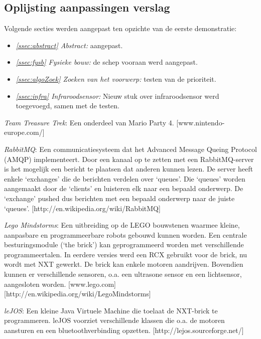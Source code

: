 \documentclass[tt2]{penoverslag}
\begin{document}
\subsection{Oplijsting aanpassingen verslag} %
\label{Assec:aanp1}
Volgende secties werden aangepast ten opzichte van de eerste demonstratie:

\begin{itemize}
\item \textit{\ref{ssec:abstract} Abstract:} aangepast.
\item \textit{\ref{ssec:fysb} Fysieke bouw:} de schep vooraan werd aangepast.
\item \textit{\ref{ssec:algoZoek} Zoeken van het voorwerp:} testen van de prioriteit.
\item \textit{\ref{ssec:infra} Infraroodsensor:} Nieuw stuk over infraroodsensor werd toegevoegd, samen met de testen.

\end{itemize}


\begin{thebibliography}{9}

\textit{Team Treasure Trek}: Een onderdeel van Mario Party 4. \mbox{[www.nintendo-europe.com/]}

\textit{RabbitMQ}: Een communicatiesysteem dat het Advanced Message Queing Protocol (AMQP) implementeert. Door een kanaal op te zetten met een RabbitMQ-server is het mogelijk een bericht te plaatsen dat anderen kunnen lezen. De server heeft enkele `exchanges' die de berichten verdelen over `queues'. Die `queues' worden aangemaakt door de `clients' en luisteren elk naar een bepaald onderwerp. De `exchange' pushed dus berichten met een bepaald onderwerp naar de juiste `queues'.
\mbox{[http://en.wikipedia.org/wiki/RabbitMQ]}

\textit{Lego Mindstorms}:  Een uitbreiding op de LEGO bouwstenen waarmee kleine, aanpasbare en programmeerbare robots gebouwd kunnen worden. Een centrale besturingsmodule (`the brick') kan geprogrammeerd worden met verschillende programmeertalen. In eerdere versies werd een RCX gebruikt voor de brick, nu wordt met NXT gewerkt. De brick kan enkele motoren aandrijven. Bovendien kunnen er verschillende sensoren, o.a. een ultrasone sensor en een lichtsensor, aangesloten worden.  \mbox{[www.lego.com]} \mbox{[http://en.wikipedia.org/wiki/Lego\textendash Mindstorms]}

\textit{leJOS}: Een kleine Java Virtuele Machine die toelaat de NXT-brick te programmeren. leJOS voorziet verschillende klassen die o.a. de motoren aansturen en een bluetoothverbinding opzetten.  \mbox{[http://lejos.sourceforge.net/]}



\end{thebibliography}
\end{document}
